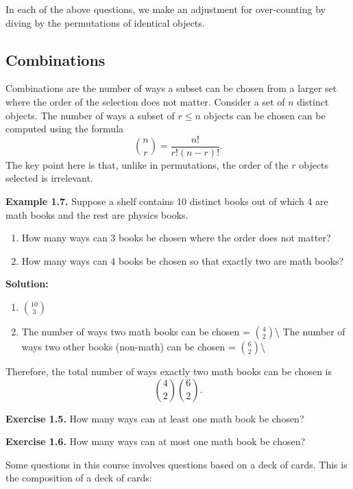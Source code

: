 \documentclass[
  12pt,
]{krantzNoCorner}
\begin{document}
In each of the above questions, we make an adjustment for over-counting
by diving by the permutations of identical objects.

\hypertarget{combinations}{%
\subsection{Combinations}\label{combinations}}

Combinations are the number of ways a subset can be chosen from a larger
set where the order of the selection does not matter. Consider a set of
\(n\) distinct objects. The number of ways a subset of \(r\leq n\) objects
can be chosen can be computed using the formula
\[{n\choose r} = \frac{n!}{r!(n-r)!}.\] The key point here is that,
unlike in permutations, the order of the \(r\) objects selected is
irrelevant.

\textbf{Example 1.7.} Suppose a shelf contains 10 distinct books out of which
4 are math books and the rest are physics books.

\begin{enumerate}
\def\labelenumi{\arabic{enumi}.}
\item
  How many ways can 3 books be chosen where the order does not matter?
\item
  How many ways can 4 books be chosen so that exactly two are math
  books?
\end{enumerate}

\textbf{Solution:}

\begin{enumerate}
\def\labelenumi{\arabic{enumi}.}
\item
  \(10\choose 3\)
\item
  The number of ways two math books can be chosen = \(4\choose 2\)\textbackslash{} The
  number of ways two other books (non-math) can be chosen =
  \(6\choose 2\)\textbackslash{}
\end{enumerate}

Therefore, the total number of ways exactly two math books can be chosen
is \[{4\choose 2}{6\choose 2}.\]

\textbf{Exercise 1.5.} How many ways can at least one math book be chosen?

\textbf{Exercise 1.6.} How many ways can at most one math book be chosen?

Some questions in this course involves questions based on a deck of
cards. This is the composition of a deck of cards:
\end{document}
